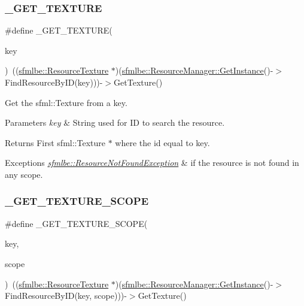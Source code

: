 \subsubsection{\texorpdfstring{\+\_\+\+G\+E\+T\+\_\+\+T\+E\+X\+T\+U\+RE}{\_GET\_TEXTURE}}
{\footnotesize\ttfamily \#define \+\_\+\+G\+E\+T\+\_\+\+T\+E\+X\+T\+U\+RE(\begin{DoxyParamCaption}\item[{}]{key }\end{DoxyParamCaption})~((\mbox{\hyperlink{classsfmlbe_1_1_resource_texture}{sfmlbe\+::\+Resource\+Texture}} $\ast$)(\mbox{\hyperlink{classsfmlbe_1_1_singleton_a313529b2a097425bf5500df8848ead3e}{sfmlbe\+::\+Resource\+Manager\+::\+Get\+Instance}}()-\/$>$Find\+Resource\+By\+ID(key)))-\/$>$Get\+Texture()}

Get the sfml\+::\+Texture from a key. 
\begin{DoxyParams}{Parameters}
{\em key} & String used for ID to search the resource. \\
\hline
\end{DoxyParams}
\begin{DoxyReturn}{Returns}
First sfml\+::\+Texture $\ast$ where the id equal to key. 
\end{DoxyReturn}

\begin{DoxyExceptions}{Exceptions}
{\em \mbox{\hyperlink{classsfmlbe_1_1_resource_not_found_exception}{sfmlbe\+::\+Resource\+Not\+Found\+Exception}}} & if the resource is not found in any scope. \\
\hline
\end{DoxyExceptions}
\mbox{\label{group___t_e_s_t___g_r_o_u_p_ga0c23c831a3c8c789dce76c32337c164f}} 
\subsubsection{\texorpdfstring{\+\_\+\+G\+E\+T\+\_\+\+T\+E\+X\+T\+U\+R\+E\+\_\+\+S\+C\+O\+PE}{\_GET\_TEXTURE\_SCOPE}}
{\footnotesize\ttfamily \#define \+\_\+\+G\+E\+T\+\_\+\+T\+E\+X\+T\+U\+R\+E\+\_\+\+S\+C\+O\+PE(\begin{DoxyParamCaption}\item[{}]{key,  }\item[{}]{scope }\end{DoxyParamCaption})~((\mbox{\hyperlink{classsfmlbe_1_1_resource_texture}{sfmlbe\+::\+Resource\+Texture}} $\ast$)(\mbox{\hyperlink{classsfmlbe_1_1_singleton_a313529b2a097425bf5500df8848ead3e}{sfmlbe\+::\+Resource\+Manager\+::\+Get\+Instance}}()-\/$>$Find\+Resource\+By\+ID(key, scope)))-\/$>$Get\+Texture()}

